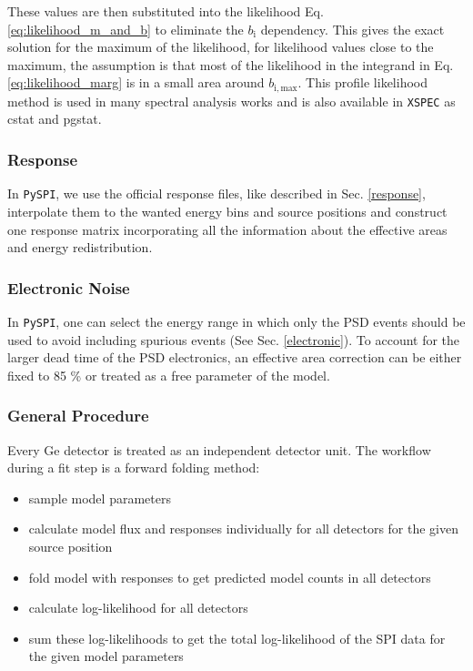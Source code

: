 \documentclass[twocolumn]{aa}
\begin{document}
These values are then substituted into the likelihood Eq. \ref{eq:likelihood_m_and_b} to eliminate the $b_{\mathrm{i}}$ dependency. This gives the exact solution for the maximum of the likelihood, for likelihood values close to the maximum, the assumption is that most of the likelihood in the integrand in Eq. \ref{eq:likelihood_marg} is in a small area around $b_{\mathrm{i,max}}$.
This profile likelihood method is used in many spectral analysis works \citep[e.g.][]{profile2, profile1} and is also available in {\tt XSPEC} \citep{xspec} as cstat and pgstat.

\subsubsection{Response}

In {\tt PySPI}, we use the official response files, like described in Sec. \ref{response}, interpolate them to the wanted energy bins and source positions and construct one response matrix incorporating all the information about the effective areas and energy redistribution.

\subsubsection{Electronic Noise}

In {\tt PySPI}, one can select the energy range in which only the PSD events should be used to avoid including spurious events (See Sec. \ref{electronic}). To account for the larger dead time of the PSD electronics, an effective area correction can be either fixed to 85 \% \citep{spi_electronic_noise} or treated as a free parameter of the model.

\subsubsection{General Procedure}

Every Ge detector is treated as an independent detector unit. The workflow during a fit step is a forward folding method:
\begin{itemize}
  \item sample model parameters
  \item calculate model flux and responses individually for all detectors for the given source position
  \item fold model with responses to get predicted model counts in all detectors
  \item calculate log-likelihood for all detectors
  \item sum these log-likelihoods to get the total log-likelihood of the SPI data for the given model parameters
\end{itemize}
\end{document}
